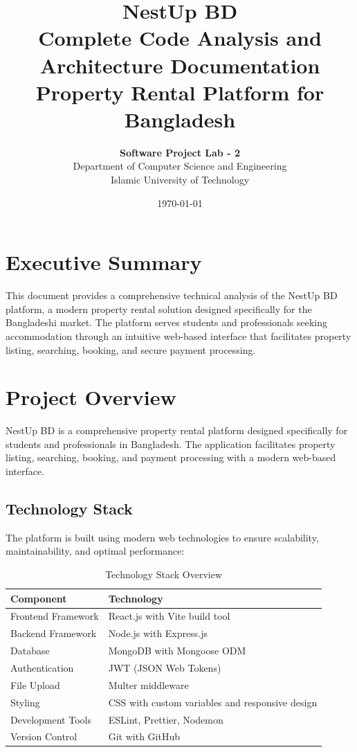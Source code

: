 \documentclass[12pt,a4paper]{article}
\title{\Huge\textbf{NestUp BD}\\[0.5cm]
       \Large Complete Code Analysis and Architecture Documentation\\[0.3cm]
       \large Property Rental Platform for Bangladesh}
\author{\textbf{Software Project Lab - 2}\\[0.2cm]
        Department of Computer Science and Engineering\\[0.1cm]
        Islamic University of Technology}
\date{\today}
\begin{document}
\maketitle
\thispagestyle{empty}
\newpage

\tableofcontents
\newpage

\section{Executive Summary}
\label{sec:executive-summary}

This document provides a comprehensive technical analysis of the NestUp BD platform, a modern property rental solution designed specifically for the Bangladeshi market. The platform serves students and professionals seeking accommodation through an intuitive web-based interface that facilitates property listing, searching, booking, and secure payment processing.

\vspace{0.5cm}

\section{Project Overview}
\label{sec:project-overview}

NestUp BD is a comprehensive property rental platform designed specifically for students and professionals in Bangladesh. The application facilitates property listing, searching, booking, and payment processing with a modern web-based interface.

\subsection{Technology Stack}
\label{subsec:technology-stack}

The platform is built using modern web technologies to ensure scalability, maintainability, and optimal performance:

\begin{table}[H]
\centering
\begin{tabular}{@{}ll@{}}
\toprule
\textbf{Component} & \textbf{Technology} \\
\midrule
Frontend Framework & React.js with Vite build tool \\
Backend Framework & Node.js with Express.js \\
Database & MongoDB with Mongoose ODM \\
Authentication & JWT (JSON Web Tokens) \\
File Upload & Multer middleware \\
Styling & CSS with custom variables and responsive design \\
Development Tools & ESLint, Prettier, Nodemon \\
Version Control & Git with GitHub \\
\bottomrule
\end{tabular}
\caption{Technology Stack Overview}
\label{tab:tech-stack}
\end{table}
\end{document}
